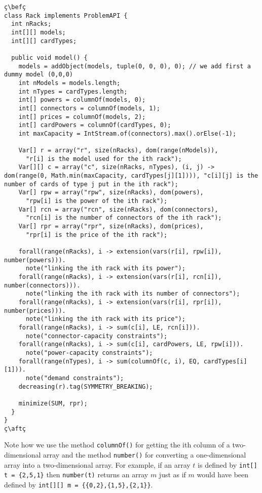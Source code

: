 \documentclass[10pt]{article}
\newcommand{\nn}[1]{{\tt #1}} %
\def\bef{\rule{10cm}{0.1mm}} %
\def\aft{\rule{10cm}{0.1mm}\medskip}
\begin{document}
\begin{lstlisting}
ç\befç
class Rack implements ProblemAPI {
  int nRacks;
  int[][] models; 
  int[][] cardTypes;

  public void model() {
    models = addObject(models, tuple(0, 0, 0), 0); // we add first a dummy model (0,0,0)
    int nModels = models.length;
    int nTypes = cardTypes.length;
    int[] powers = columnOf(models, 0);
    int[] connectors = columnOf(models, 1);
    int[] prices = columnOf(models, 2);
    int[] cardPowers = columnOf(cardTypes, 0);
    int maxCapacity = IntStream.of(connectors).max().orElse(-1);
    
    Var[] r = array("r", size(nRacks), dom(range(nModels)),
      "r[i] is the model used for the ith rack");
    Var[][] c = array("c", size(nRacks, nTypes), (i, j) -> dom(range(0, Math.min(maxCapacity, cardTypes[j][1]))), "c[i][j] is the number of cards of type j put in the ith rack");
    Var[] rpw = array("rpw", size(nRacks), dom(powers),
      "rpw[i] is the power of the ith rack");
    Var[] rcn = array("rcn", size(nRacks), dom(connectors),
      "rcn[i] is the number of connectors of the ith rack");
    Var[] rpr = array("rpr", size(nRacks), dom(prices),
      "rpr[i] is the price of the ith rack");
    
    forall(range(nRacks), i -> extension(vars(r[i], rpw[i]), number(powers))).
      note("linking the ith rack with its power");
    forall(range(nRacks), i -> extension(vars(r[i], rcn[i]), number(connectors))).
      note("linking the ith rack with its number of connectors");
    forall(range(nRacks), i -> extension(vars(r[i], rpr[i]), number(prices))).
      note("linking the ith rack with its price");
    forall(range(nRacks), i -> sum(c[i], LE, rcn[i])).
      note("connector-capacity constraints");
    forall(range(nRacks), i -> sum(c[i], cardPowers, LE, rpw[i])).
      note("power-capacity constraints");
    forall(range(nTypes), i -> sum(columnOf(c, i), EQ, cardTypes[i][1])).
      note("demand constraints");
    decreasing(r).tag(SYMMETRY_BREAKING);
    
    minimize(SUM, rpr);
  }
}
ç\aftç
\end{lstlisting}

Note how we use the method \nn{columnOf()} for getting the ith column of a two-dimensional array and the method \nn{number()} for converting a one-dimensional array into a two-dimensional array.
For example, if an array $t$ is defined by \verb!int[] t = {2,5,1}! then \verb!number(t)! returns an array $m$ just as if $m$ would have been defined by \verb!int[][] m = {{0,2},{1,5},{2,1}}!.
\end{document}

